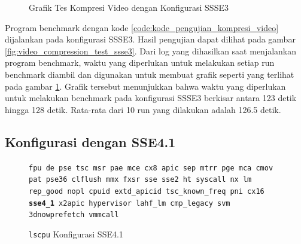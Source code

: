 \begin{figure}
    \centering
    \caption{Grafik Tes Kompresi Video dengan Konfigurasi SSSE3}
    \label{fig:video_compression_test_ssse3_graph}
\end{figure}

Program benchmark dengan kode \ref{code:kode_pengujian_kompresi_video} dijalankan pada konfigurasi SSSE3. Hasil pengujian dapat dilihat pada gambar \ref{fig:video_compression_test_ssse3}. Dari log yang dihasilkan saat menjalankan program benchmark, waktu yang diperlukan untuk melakukan setiap run benchmark diambil dan digunakan untuk membuat grafik seperti yang terlihat pada gambar \ref{fig:video_compression_test_ssse3_graph}. Grafik tersebut menunjukkan bahwa waktu yang diperlukan untuk melakukan benchmark pada konfigurasi SSSE3 berkisar antara 123 detik hingga 128 detik. Rata-rata dari 10 run yang dilakukan adalah 126.5 detik.

\subsection{Konfigurasi dengan SSE4.1}
\begin{figure}
    \texttt{fpu de pse tsc msr pae mce cx8 apic sep mtrr pge mca cmov pat pse36 clflush mmx fxsr sse sse2 ht syscall nx lm rep\_good nopl cpuid extd\_apicid tsc\_known\_freq pni cx16 \textbf{sse4\_1} x2apic hypervisor lahf\_lm cmp\_legacy svm 3dnowprefetch vmmcall}
    \caption{\texttt{lscpu} Konfigurasi SSE4.1}
    \label{fig:lscpu_video_compression_test_sse4.1}
\end{figure}

